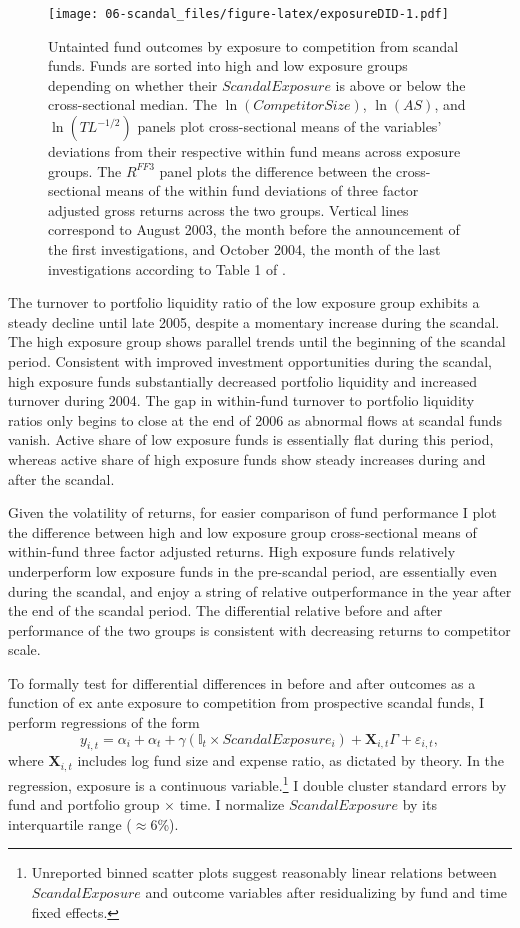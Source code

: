 \documentclass[]{book}
\let\rmarkdownfootnote\footnote%
\def\footnote{\protect\rmarkdownfootnote}
\theoremstyle{definition}
\theoremstyle{definition}
\theoremstyle{definition}
\theoremstyle{remark}
\begin{document}
\begin{figure}
\centering
\texttt{[image: 06-scandal\_files/figure-latex/exposureDID-1.pdf]}
\caption{\label{fig:exposureDID}Untainted fund outcomes by exposure to
competition from scandal funds. Funds are sorted into high and low
exposure groups depending on whether their \(ScandalExposure\) is above
or below the cross-sectional median. The \(\ln(CompetitorSize)\),
\(\ln(AS)\), and \(\ln(TL^{-1/2})\) panels plot cross-sectional means of
the variables' deviations from their respective within fund means across
exposure groups. The \(R^{FF3}\) panel plots the difference between the
cross-sectional means of the within fund deviations of three factor
adjusted gross returns across the two groups. Vertical lines correspond
to August 2003, the month before the announcement of the first
investigations, and October 2004, the month of the last investigations
according to Table 1 of \citet{hw05}.}
\end{figure}

The turnover to portfolio liquidity ratio of the low exposure group
exhibits a steady decline until late 2005, despite a momentary increase
during the scandal. The high exposure group shows parallel trends until
the beginning of the scandal period. Consistent with improved investment
opportunities during the scandal, high exposure funds substantially
decreased portfolio liquidity and increased turnover during 2004. The
gap in within-fund turnover to portfolio liquidity ratios only begins to
close at the end of 2006 as abnormal flows at scandal funds vanish.
Active share of low exposure funds is essentially flat during this
period, whereas active share of high exposure funds show steady
increases during and after the scandal.

Given the volatility of returns, for easier comparison of fund
performance I plot the difference between high and low exposure group
cross-sectional means of within-fund three factor adjusted returns. High
exposure funds relatively underperform low exposure funds in the
pre-scandal period, are essentially even during the scandal, and enjoy a
string of relative outperformance in the year after the end of the
scandal period. The differential relative before and after performance
of the two groups is consistent with decreasing returns to competitor
scale.

To formally test for differential differences in before and after
outcomes as a function of ex ante exposure to competition from
prospective scandal funds, I perform regressions of the form
\begin{equation}
y_{i,t} = \alpha_i + \alpha_t + \gamma \left( \mathbb{I}_t \times ScandalExposure_i \right) + \mathbf{X}_{i,t}\Gamma + \varepsilon_{i,t},
\label{eq:didReg}
\end{equation} where \(\mathbf{X}_{i,t}\) includes log fund size and
expense ratio, as dictated by theory. In the regression, exposure is a
continuous variable.\footnote{
Unreported binned scatter plots suggest reasonably linear relations between $ScandalExposure$ and outcome variables after residualizing by fund and time fixed effects.
} I double cluster standard errors by fund and portfolio group
\(\times\) time. I normalize \(ScandalExposure\) by its interquartile
range (\(\approx 6\)\%).
\end{document}
